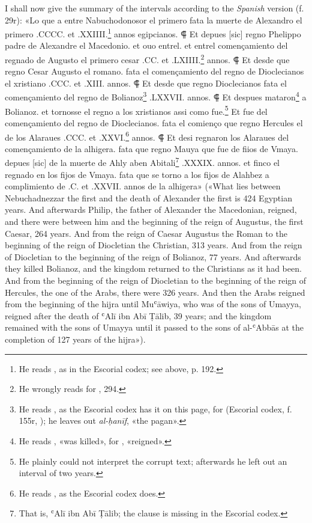 \documentclass[11pt]{article}
\begin{document}
\par I shall now give the summary of the intervals according to the \emph{Spanish} version (f. 29r): «Lo que a entre Nabuchodonosor el primero fata la muerte de Alexandro el primero .CCCC. et .XXIIII.\footnote{He reads , as in the Escorial codex; see above, p. 192.} annos egipcianos. {\CapFont ⸿} Et depues [sic] regno Phelippo padre de Alexandre el Macedonio. et ouo entrel. et entrel començamiento del regnado de Augusto el primero cesar .CC. et .LXIIII.\footnote{He wrongly reads  for , 294.} annos. {\CapFont ⸿} Et desde que regno Cesar Augusto el romano. fata el començamiento del regno de Dioclecianos el xristiano .CCC. et .XIII. annos. {\CapFont ⸿} Et desde que regno Dioclecianos fata el començamiento del regno de Bolianoz\footnote{He reads , as the Escorial codex has it on this page, for  (Escorial codex, f. 155r, ); he leaves out \emph{al-ḥanīf}, «the pagan».} .LXXVII. annos. {\CapFont ⸿} Et despues mataron\footnote{He reads , «was killed», for , «reigned».} a Bolianoz. et tornosse el regno a los xristianos assi como fue.\footnote{He plainly could not interpret the corrupt text; afterwards he left out an interval of two years.} Et fue del començamiento del regno de Dioclecianos. fata el comienço que regno Hercules el de los Alaraues .CCC. et .XXVI.\footnote{He reads , as the Escorial codex does.} annos. {\CapFont ⸿} Et desi regnaron los Alaraues del començamiento de la alhigera. fata que regno Mauya que fue de fiios de Vmaya. depues [sic] de la muerte de Ahly aben Abitali\footnote{That is, ʿAlī ibn Abī Ṭālib; the clause is missing in the Escorial codex.} .XXXIX. annos. et finco el regnado en los fijos de Vmaya. fata que se torno a los fijos de Alahbez a complimiento de .C. et .XXVII. annos de la alhigera» («What lies between Nebuchadnezzar the first and the death of Alexander the first is 424 Egyptian years. And afterwards Philip, the father of Alexander the Macedonian, reigned, and there were between him and the beginning of the reign of Augustus, the first Caesar, 264 years. And from the reign of Caesar Augustus the Roman to the beginning of the reign of Diocletian the Christian, 313 years. And from the reign of Diocletian to the beginning of the reign of Bolianoz, 77 years. And afterwards they killed Bolianoz, and the kingdom returned to the Christians as it had been. And from the beginning of the reign of Diocletian to the beginning of the reign of Hercules, the one of the Arabs, there were 326 years. And then the Arabs reigned from the beginning of the hijra until Muʿāwiya, who was of the sons of Umayya, reigned after the death of ʿAlī ibn Abī Ṭālib, 39 years; and the kingdom remained with the sons of Umayya until it passed to the sons of al-ʿAbbās at the completion of 127 years of the hijra»).\par
\end{document}
